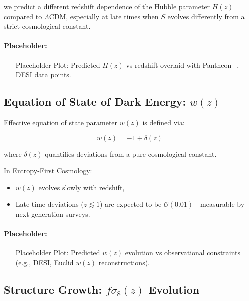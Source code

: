 \documentclass{article}
\begin{document}
we predict a different redshift dependence of the Hubble parameter $H(z)$ compared to $\Lambda$CDM, especially at late times when $\ddot{S}$ evolves differently from a strict cosmological constant.

\paragraph{Placeholder:}

\begin{itemize}
    \item [Placeholder] Plot: Predicted $H(z)$ vs redshift overlaid with Pantheon+, DESI data points.
\end{itemize}



\subsection{Equation of State of Dark Energy: $w(z)$}

Effective equation of state parameter $w(z)$ is defined via:

\[
w(z) = -1 + \delta(z)
\]

where $\delta(z)$ quantifies deviations from a pure cosmological constant.

In Entropy-First Cosmology:
\begin{itemize}
    \item $w(z)$ evolves slowly with redshift,
    \item Late-time deviations ($z \lesssim 1$) are expected to be $\mathcal{O}(0.01)$ - measurable by next-generation surveys.
\end{itemize}

\paragraph{Placeholder:}

\begin{itemize}
    \item [Placeholder] Plot: Predicted $w(z)$ evolution vs observational constraints (e.g., DESI, Euclid $w(z)$ reconstructions).
\end{itemize}



\subsection{Structure Growth: $f\sigma_8(z)$ Evolution}
\end{document}
